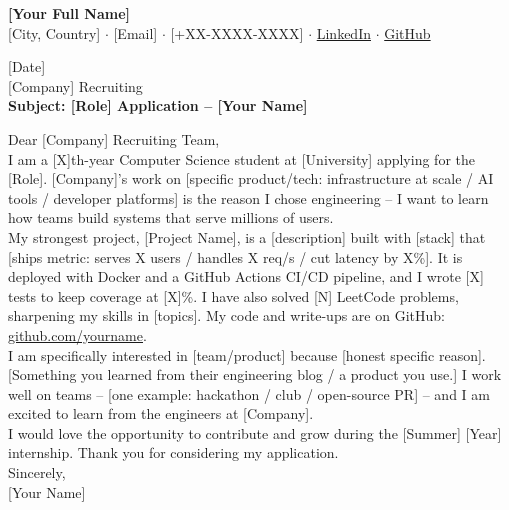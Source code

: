 \documentclass[11pt, letterpaper]{article}
\begin{document}
\begin{center}
  {\LARGE\bfseries [Your Full Name]}\\[4pt]
  {\small [City, Country] $\cdot$ [Email] $\cdot$ [+XX-XXXX-XXXX] $\cdot$%
   \href{https://linkedin.com/in/yourname}{LinkedIn} $\cdot$%
   \href{https://github.com/yourname}{GitHub}}
\end{center}

\vspace{14pt}

[Date]\\[8pt]

[Company] Recruiting\\
[Role -- e.g., Software Engineer Intern]

\vspace{10pt}
\textbf{Subject: [Role] Application -- [Your Name]}

\vspace{10pt}
Dear [Company] Recruiting Team,\\[8pt]

I am a [X]th-year Computer Science student at [University] applying for the
[Role]. [Company]'s work on [specific product/tech: infrastructure at scale /
AI tools / developer platforms] is the reason I chose engineering -- I want
to learn how teams build systems that serve millions of users.\\[8pt]

My strongest project, [Project Name], is a [description] built with [stack]
that [ships metric: serves X users / handles X req/s / cut latency by X\%].
It is deployed with Docker and a GitHub Actions CI/CD pipeline, and I wrote
[X] tests to keep coverage at [X]\%. I have also solved [N] LeetCode
problems, sharpening my skills in [topics]. My code and write-ups are on
GitHub: \href{https://github.com/yourname}{github.com/yourname}.\\[8pt]

I am specifically interested in [team/product] because [honest specific
reason]. [Something you learned from their engineering blog / a product you
use.] I work well on teams -- [one example: hackathon / club / open-source
PR] -- and I am excited to learn from the engineers at [Company].\\[8pt]

I would love the opportunity to contribute and grow during the [Summer]
[Year] internship. Thank you for considering my application.\\[14pt]

Sincerely,\\[4pt]
[Your Name]
\end{document}
